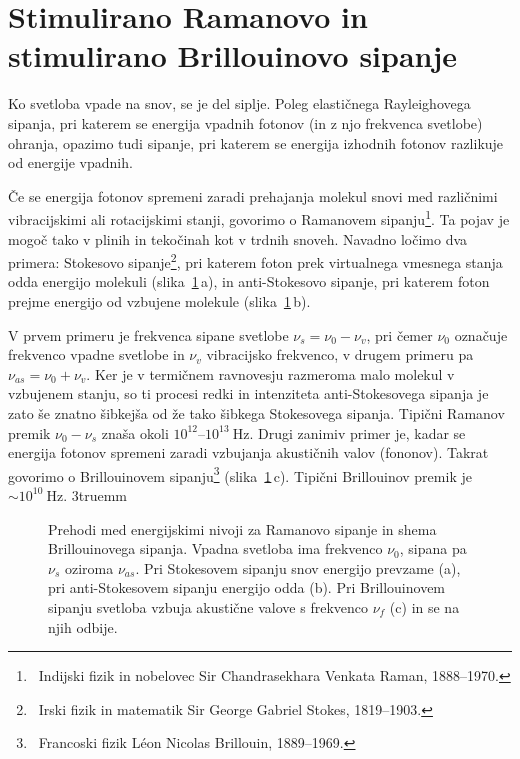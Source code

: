 \section{Stimulirano Ramanovo in stimulirano Brillouinovo sipanje}
\label{chap:SRS}
Ko svetloba vpade na snov, se je del siplje. Poleg elastičnega Rayleighovega sipanja,
pri katerem se energija vpadnih fotonov (in z njo frekvenca svetlobe) ohranja, opazimo 
tudi sipanje, pri katerem se energija izhodnih fotonov razlikuje od energije 
vpadnih. 

Če se energija fotonov spremeni zaradi prehajanja molekul snovi med različnimi
vibracijskimi ali rotacijskimi stanji, govorimo o Ramanovem
sipanju\footnote{~Indijski fizik in nobelovec Sir Chandrasekhara Venkata Raman, 1888--1970.}. 
Ta pojav je mogoč tako v plinih in tekočinah kot v trdnih snoveh. Navadno 
ločimo dva primera: Stokesovo sipanje\footnote{~Irski fizik in matematik Sir George Gabriel
Stokes, 1819--1903.}, pri katerem foton prek virtualnega vmesnega stanja 
odda energijo molekuli (slika~\ref{08_Raman}\,a),
in anti-Stokesovo sipanje,
pri katerem foton prejme energijo od vzbujene molekule (slika~\ref{08_Raman}\,b).

V prvem primeru je frekvenca
sipane svetlobe $\nu_s=\nu_0-\nu_v$, pri čemer $\nu_0$ označuje frekvenco vpadne
svetlobe in $\nu_v$ vibracijsko frekvenco, v drugem primeru pa $\nu_{as}=\nu_0+\nu_v$.
Ker je v termičnem ravnovesju razmeroma malo molekul v vzbujenem stanju, so ti 
procesi redki in intenziteta anti-Stokesovega sipanja je zato 
še znatno šibkejša od že tako šibkega Stokesovega sipanja. Tipični Ramanov premik 
$\nu_0-\nu_s$ znaša okoli $10^{12}$--$10^{13}~\si{\hertz}$.
Drugi zanimiv primer je, kadar se energija fotonov spremeni zaradi 
vzbujanja akustičnih valov (fononov). Takrat govorimo o Brillouinovem 
sipanju\footnote{~Francoski fizik L\'eon Nicolas Brillouin, 1889--1969.} (slika~\ref{08_Raman}\,c).
Tipični Brillouinov premik je $\sim 10^{10}~\si{\hertz}$. 
\vglue3truemm

\begin{figure}[ht]
\centering
\def\svgwidth{128truemm} 

\caption{Prehodi med energijskimi nivoji za Ramanovo sipanje in shema Brillouinovega sipanja. Vpadna 
svetloba ima frekvenco $\nu_0$, sipana pa $\nu_s$ oziroma $\nu_{as}$. Pri Stokesovem sipanju 
snov energijo prevzame (a), pri anti-Stokesovem sipanju energijo odda (b).
Pri Brillouinovem sipanju svetloba vzbuja akustične valove s frekvenco $\nu_f$ (c) in se na njih odbije.}
\label{08_Raman}
\end{figure}

